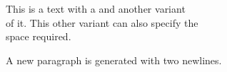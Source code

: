 This is a text with a \newline and another variant\\ of it. This other variant
can also specify the\\[0.5cm]space required.

A new paragraph is generated with two newlines.
